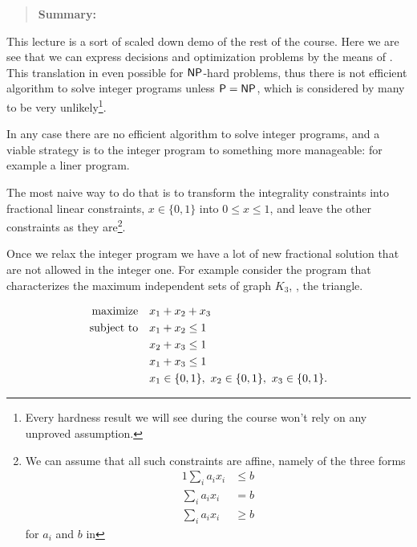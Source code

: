 \documentclass[a4paper,twoside,justified]{tufte-handout}
\begin{document}
 
\maketitle
\thispagestyle{fancy}
\begin{abstract}
  \textbf{Summary:} \DataAbstract
\end{abstract}


This lecture is a sort of scaled down demo of the rest of the
course. Here we are see that we can express decisions and optimization
problems by the means of . This translation in
even possible for $ \mathsf{NP} $-hard problems, thus there is not efficient
algorithm to solve integer programs unless $\mathsf{P}=\mathsf{NP}$, which is
considered by many to be very unlikely\footnote{Every hardness result
  we will see during the course won't rely on any unproved assumption.}.

In any case there are no  efficient algorithm to
solve integer programs, and a viable strategy is to
 the integer program to something more
manageable: for example a liner program.

The most naive way to do that is to transform the integrality
constraints into fractional linear constraints, \eg $ x \in\{0,1\} $
into $ 0 \leq x \leq 1 $, and leave the other constraints as they
are\footnote{We can assume that all such constraints are affine,
  namely of the three forms
  \begin{alignat*}{1}
  \sum_{i}a_{i}x_{i} & \leq b\\
  \sum_{i}a_{i}x_{i} & = b \\
  \sum_{i}a_{i}x_{i} & \geq b
  \end{alignat*}
for $a_i$ and $ b $ in \RR}.

Once we relax the integer program we have a lot of new fractional
solution that are not allowed in the integer one. For example consider
the program that characterizes the maximum independent sets of graph $
K_{3} $, \ie, the triangle.

\begin{alignat}{2}
  \maximize x_{1} + x_{2} + x_{3} \notag\\
  \subjectto   x_{1} + x_{2} \leq 1 \notag\\
             & x_{2} + x_{3} \leq 1 \label{eq:triangle-ind-set}\\
             & x_{1} + x_{3} \leq 1 \notag\\
             & \varboolean{x_{1}},\ \varboolean{x_{2}},\ \varboolean{x_{3}}.\notag
\end{alignat}
\end{document}
